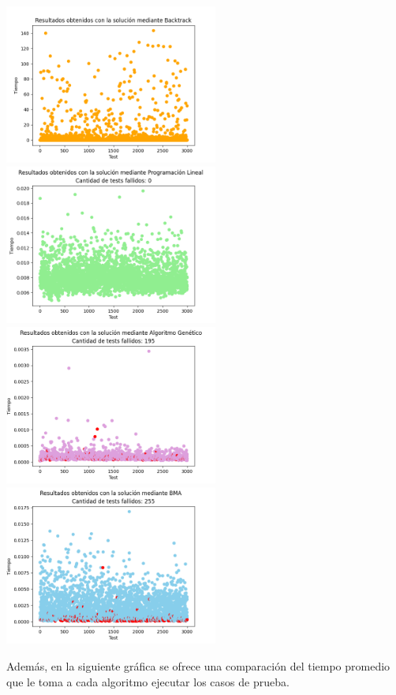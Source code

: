 \documentclass[10pt]{article} %
\begin{document}
    \begin{center}
    	\includegraphics[width=7cm]{Backtrack_results.png}
		\includegraphics[width=7cm]{LP_results}
		\includegraphics[width=7cm]{GA_results}
		\includegraphics[width=7cm]{BMA_results}
	\end{center}
 
    Adem\'as, en la siguiente gr\'afica se ofrece una comparaci\'on del tiempo promedio que le toma a cada algoritmo ejecutar los casos de prueba. 
    
\end{document}
